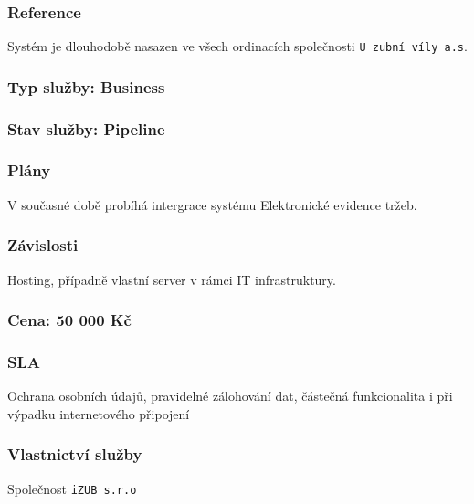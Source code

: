 \documentclass[11pt, a4paper, titlepage]{article}
\begin{document}
	\subsubsection*{Reference}
	Systém je dlouhodobě nasazen ve všech ordinacích společnosti \texttt{U zubní víly a.s}.

	\subsubsection*{Typ služby: Business}

	\subsubsection*{Stav služby: Pipeline}

	\subsubsection*{Plány}
	V současné době probíhá intergrace systému Elektronické evidence tržeb.

	\subsubsection*{Závislosti}
	Hosting, případně vlastní server v rámci IT infrastruktury.

	\subsubsection*{Cena: 50 000 Kč}

	\subsubsection*{SLA}
	Ochrana osobních údajů, pravidelné zálohování dat, částečná funkcionalita i při výpadku internetového připojení

	\subsubsection*{Vlastnictví služby}
	Společnost \texttt{iZUB s.r.o}
\end{document}
